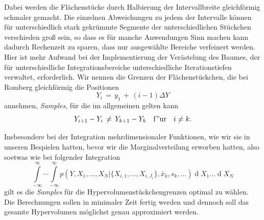 Dabei werden die Flächenstücke durch Halbierung der Intervallbreite gleichförmig schmaler gemacht.
Die einzelnen Abweichungen zu jedem der Intervalle können für unterschiedlich stark gekrümmte
Segmente der unterschiedlichen Stückchen verschieden groß sein, so dass es für manche
Anwendungen Sinn machen kann dadurch Rechenzeit zu sparen, dass nur ausgewählte Bereiche
verfeinert werden. Hier ist mehr Aufwand bei der Implementierung der Verästelung des Baumes,
der für unterschiedliche Integrationsbereiche unterschiedliche Iterationstiefen verwaltet,
erforderlich. Wir nennen die Grenzen der Flächenstückchen, die bei Romberg gleichförmig die Positionen
$$
Y_i \, = \, y_1 \, + \, (i-1) \Delta Y
$$
annehmen, \textsl{Samples}, für die im allgemeinen gelten kann
\begin{equation}
Y_{i+1} - Y_i \, \neq \, Y_{k+1} - Y_k \quad \mathrm{f{"u}r} \quad i \neq k .
\end{equation}


Insbesondere bei der Integration mehrdimensionaler Funktionen, wie wir sie
in unseren Bespielen hatten, bevor wir die Marginalverteilung erworben hatten,
also soetwas wie bei folgender Integration
$$
\int\limits_{-\infty}^\infty \cdots \int\limits_{-\infty}^\infty
p(Y, X_1, \dots, X_N | \{X_{i,1}, \dots, X_{i,J_i}\}, \bar x_k, s_k, \dots)
\operatorname{d}X_1 \dots \operatorname{d}X_N
$$
gilt es die \textsl{Samples} für die Hypervolumenstückchengrenzen optimal zu wählen.
Die Berechnungen sollen in minimaler Zeit fertig werden und dennoch soll das
gesamte Hypervolumen möglichst genau approximiert werden.


